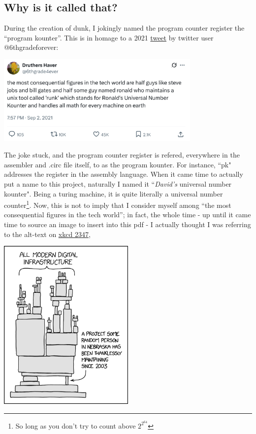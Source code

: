 \documentclass{article}
\begin{document}
\subsection{Why is it called that?}

During the creation of dunk, I jokingly named the program counter register the ``program kounter''. This is in homage to a 2021 \href{https://x.com/6thgrade4ever/status/1433519577892327424}{tweet} by twitter user @6thgradeforever:

    \begin{center}\includegraphics[width=0.75\textwidth]{images/runk.png}\end{center}

The joke stuck, and the program counter register is refered, everywhere in the assembler and .circ file itself, to as the program kounter. For instance, ``pk" addresses the register in the assembly language. When it came time to actually put a name to this project, naturally I named it ``\textit{David's} universal number kounter". Being a turing machine, it is quite literally a universal number counter\footnote{So long as you don't try to count above $2^{2^{64}}$}. Now, this is not to imply that I consider myself among ``the most consequential figures in the tech world''; in fact, the whole time - up until it came time to source an image to insert into this pdf - 	I actually thought I was referring to the alt-text on \href{https://xkcd.com/2347/}{xkcd 2347},

    \begin{center}\includegraphics[width=0.5\textwidth]{images/2347.png}\end{center}
\end{document}
